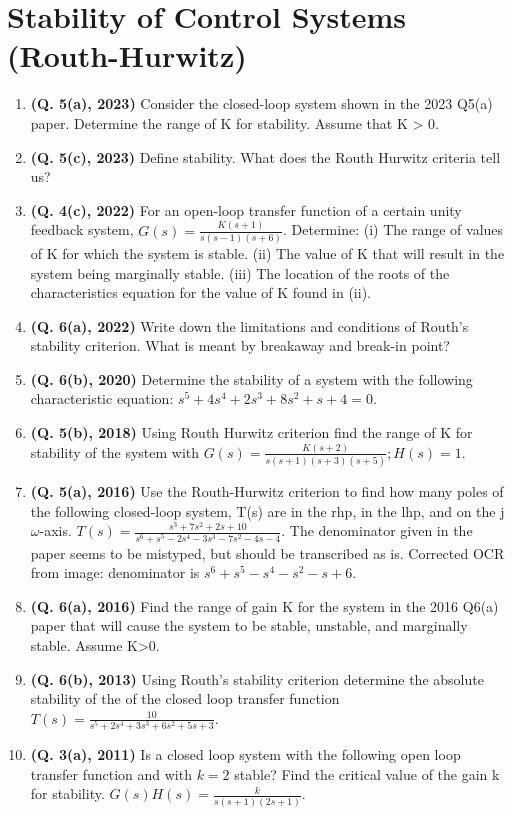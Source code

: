 \documentclass[12pt, a4paper]{article}
\begin{document}
	\section{Stability of Control Systems (Routh-Hurwitz)}
	\begin{enumerate}
		\item \textbf{(Q. 5(a), 2023)} Consider the closed-loop system shown in the 2023 Q5(a) paper. Determine the range of K for stability. Assume that K > 0.
		\item \textbf{(Q. 5(c), 2023)} Define stability. What does the Routh Hurwitz criteria tell us?
		\item \textbf{(Q. 4(c), 2022)} For an open-loop transfer function of a certain unity feedback system, $G(s) = \frac{K(s+1)}{s(s-1)(s+6)}$. Determine: (i) The range of values of K for which the system is stable. (ii) The value of K that will result in the system being marginally stable. (iii) The location of the roots of the characteristics equation for the value of K found in (ii).
		\item \textbf{(Q. 6(a), 2022)} Write down the limitations and conditions of Routh's stability criterion. What is meant by breakaway and break-in point?
		\item \textbf{(Q. 6(b), 2020)} Determine the stability of a system with the following characteristic equation: $s^5 + 4s^4 + 2s^3 + 8s^2 + s + 4 = 0$.
		\item \textbf{(Q. 5(b), 2018)} Using Routh Hurwitz criterion find the range of K for stability of the system with $G(s) = \frac{K(s+2)}{s(s+1)(s+3)(s+5)}; H(s)=1$.
		\item \textbf{(Q. 5(a), 2016)} Use the Routh-Hurwitz criterion to find how many poles of the following closed-loop system, T(s) are in the rhp, in the lhp, and on the j$\omega$-axis. $T(s) = \frac{s^3+7s^2+2s+10}{s^6+s^5-2s^4-3s^3-7s^2-4s-4}$. The denominator given in the paper seems to be mistyped, but should be transcribed as is. Corrected OCR from image: denominator is $s^6+s^5-s^4-s^2-s+6$.
		\item \textbf{(Q. 6(a), 2016)} Find the range of gain K for the system in the 2016 Q6(a) paper that will cause the system to be stable, unstable, and marginally stable. Assume K>0.
		\item \textbf{(Q. 6(b), 2013)} Using Routh's stability criterion determine the absolute stability of the of the closed loop transfer function $T(s) = \frac{10}{s^5+2s^4+3s^3+6s^2+5s+3}$.
		\item \textbf{(Q. 3(a), 2011)} Is a closed loop system with the following open loop transfer function and with $k=2$ stable? Find the critical value of the gain k for stability. $G(s)H(s) = \frac{k}{s(s+1)(2s+1)}$.
	\end{enumerate}
	
\end{document}
